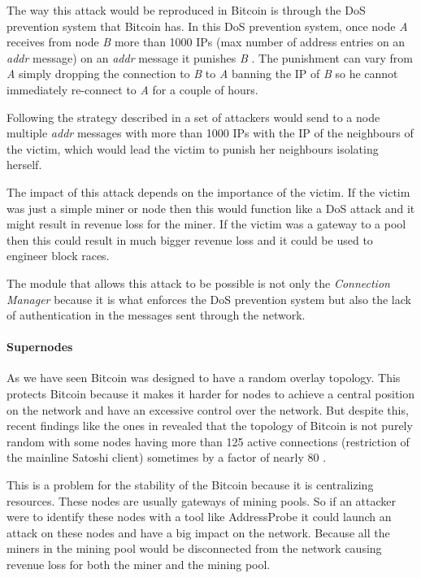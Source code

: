 The way this attack would be reproduced in Bitcoin is through the DoS prevention system that Bitcoin has. In this DoS prevention system, once node \textit{A} receives from node \textit{B} more than 1000 IPs (max number of address entries on an \textit{addr} message) on an \textit{addr} message it punishes \textit{B} \cite{bitcoinwiki}. The punishment can vary from \textit{A} simply dropping the connection to \textit{B} to \textit{A} banning the IP of \textit{B} so he cannot immediately re-connect to \textit{A} for a couple of hours.

Following the strategy described in \cite{jesi2009secure} a set of attackers would send to a node multiple \textit{addr} messages with more than 1000 IPs with the IP of the neighbours of the victim, which would lead the victim to punish her neighbours isolating herself.

The impact of this attack depends on the importance of the victim. If the victim was just a simple miner or node then this would function like a DoS attack and it might result in revenue loss for the miner. If the victim was a gateway to a pool then this could result in much bigger revenue loss and it could be used to engineer block races.

The module that allows this attack to be possible is not only the \textit{Connection Manager} because it is what enforces the DoS prevention system but also the lack of authentication in the messages sent through the network.

\paragraph*{\textbf{Supernodes}} As we have seen Bitcoin was designed to have a random overlay topology. This protects Bitcoin because it makes it harder for nodes to achieve a central position on the network and have an excessive control over the network. But despite this, recent findings like the ones in \cite{miller2015discovering} revealed that the topology of Bitcoin is not purely random with some nodes having more than 125 active connections (restriction of the mainline Satoshi client) sometimes by a factor of nearly 80 \cite{miller2015discovering}.

This is a problem for the stability of the Bitcoin because it is centralizing resources. These nodes are usually gateways of mining pools. So if an attacker were to identify these nodes with a tool like AddressProbe \cite{miller2015discovering} it could launch an attack on these nodes and have a big impact on the network. Because all the miners in the mining pool would be disconnected from the network causing revenue loss for both the miner and the mining pool.

